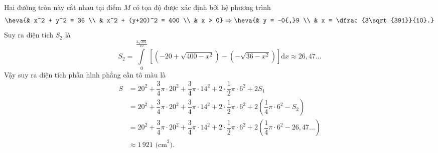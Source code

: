 \begin{ex}
{{
		}
		\noindent Hai đường tròn này cắt nhau tại điểm $M$ có tọa độ được xác định bởi hệ phương trình
		\[ \heva{& x^2 + y^2 = 36 \\ & x^2 + (y+20)^2 = 400 \\ & x > 0} \Rightarrow \heva{& y = -0{,}9 \\ & x = \dfrac{3\sqrt{391}}{10}.} \]
		Suy ra diện tích $S_2$ là
		\[ S_2 = \displaystyle\int\limits_0^{\frac{3\sqrt{391}}{10}} \left[ \left(-20 + \sqrt{400 - x^2}\right) - \left(-\sqrt{36 - x^2}\right) \right] \mathrm{d}x \approx 26{,}47\dots \]
		Vậy suy ra diện tích phần hình phẳng cần tô màu là
		\begin{align*}
			S &= 20^2 + \dfrac{3}{4}\pi \cdot 20^2 + \dfrac{3}{4}\pi \cdot 14^2 + 2 \cdot \dfrac{1}{2}\pi \cdot 6^2 + 2S_1 \\
			&= 20^2 + \dfrac{3}{4}\pi \cdot 20^2 + \dfrac{3}{4}\pi \cdot 14^2 + 2 \cdot \dfrac{1}{2}\pi \cdot 6^2 + 2 \left( \dfrac{1}{4}\pi \cdot 6^2 - S_2 \right) \\
			&= 20^2 + \dfrac{3}{4}\pi \cdot 20^2 + \dfrac{3}{4}\pi \cdot 14^2 + 2 \cdot \dfrac{1}{2}\pi \cdot 6^2 + 2 \left( \dfrac{1}{4}\pi \cdot 6^2 - 26{,}47\dots \right) \\
			&\approx 1\,921 \text{ (cm}^2).
		\end{align*}
	}
\end{ex}

